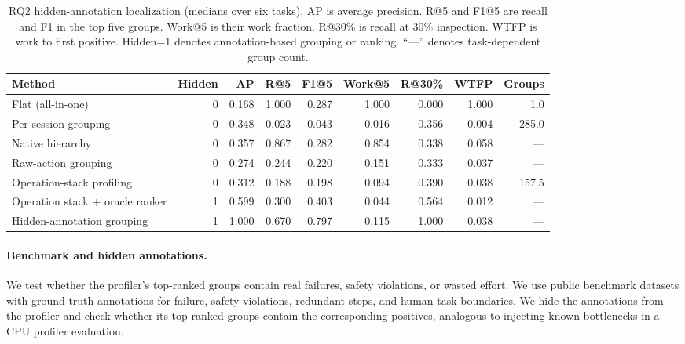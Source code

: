 \documentclass[letterpaper]{article}
\begin{document}
\begin{table}[t!]
\centering
{\small
\begin{tabular}{lrrrrrrrr}
\toprule
Method & Hidden & AP & R@5 & F1@5 & Work@5 & R@30\% & WTFP & Groups \\
\midrule
Flat (all-in-one) & 0 & 0.168 & 1.000 & 0.287 & 1.000 & 0.000 & 1.000 & 1.0 \\
Per-session grouping & 0 & 0.348 & 0.023 & 0.043 & 0.016 & 0.356 & 0.004 & 285.0 \\
Native hierarchy & 0 & 0.357 & 0.867 & 0.282 & 0.854 & 0.338 & 0.058 & --- \\
Raw-action grouping & 0 & 0.274 & 0.244 & 0.220 & 0.151 & 0.333 & 0.037 & --- \\
Operation-stack profiling & 0 & 0.312 & 0.188 & 0.198 & 0.094 & 0.390 & 0.038 & 157.5 \\
Operation stack + oracle ranker & 1 & 0.599 & 0.300 & 0.403 & 0.044 & 0.564 & 0.012 & --- \\
Hidden-annotation grouping & 1 & 1.000 & 0.670 & 0.797 & 0.115 & 1.000 & 0.038 & --- \\
\bottomrule
\end{tabular}
}
\caption{RQ2 hidden-annotation localization (medians over six tasks).
AP is average precision. R@5 and F1@5 are recall and F1 in the top five groups.
Work@5 is their work fraction. R@30\% is recall at 30\% inspection. WTFP is
work to first positive. Hidden=1 denotes annotation-based grouping or ranking.
``---'' denotes task-dependent group count.}
\label{tab:localization}
\end{table}

\paragraph{Benchmark and hidden annotations.}
We test whether the profiler's top-ranked groups contain real failures, safety
violations, or wasted effort.
We use public benchmark datasets with ground-truth annotations for failure,
safety violations, redundant steps, and human-task boundaries. We hide the
annotations from the profiler and check whether its top-ranked groups contain
the corresponding positives, analogous to injecting known bottlenecks in a CPU
profiler evaluation.
\end{document}

